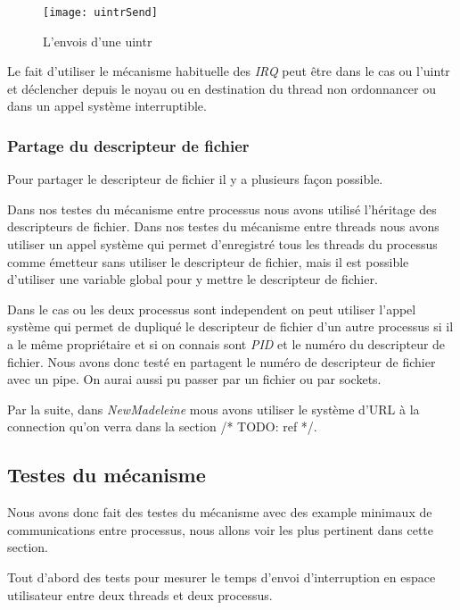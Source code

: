 \begin{figure}[H]
  \texttt{[image: uintrSend]}
  \caption{L'envois d'une uintr}
  \label{fig:sendUintr}
\end{figure}

Le fait d'utiliser le mécanisme habituelle des \emph{IRQ} peut être dans le cas ou l'uintr et déclencher depuis le noyau ou en destination du thread non ordonnancer ou dans un appel système interruptible.

\subsubsection{Partage du descripteur de fichier}
\label{sec:shareFD}

Pour partager le descripteur de fichier il y a plusieurs façon possible.

Dans nos testes du mécanisme entre processus nous avons utilisé l'héritage des descripteurs de fichier.
Dans nos testes du mécanisme entre threads nous avons utiliser un appel système qui permet d'enregistré tous les threads du processus comme émetteur sans utiliser le descripteur de fichier, %
mais il est possible d'utiliser une variable global pour y mettre le descripteur de fichier.

Dans le cas ou les deux processus sont independent on peut utiliser l'appel système  qui permet de dupliqué le descripteur de fichier d'un autre processus si il a le même propriétaire et si on connais sont \emph{PID} et le numéro du descripteur de fichier.
Nous avons donc testé en partagent le numéro de descripteur de fichier avec un pipe.
On aurai aussi pu passer par un fichier ou par sockets.

Par la suite, dans \emph{NewMadeleine} mous avons utiliser le système d'URL à la connection qu'on verra dans la section /* TODO: ref */.

\subsection{Testes du mécanisme}

Nous avons donc fait des testes du mécanisme avec des example minimaux de communications entre processus, nous allons voir les plus pertinent dans cette section.

Tout d'abord des tests pour mesurer le temps d'envoi d'interruption en espace utilisateur entre deux threads et deux processus.


